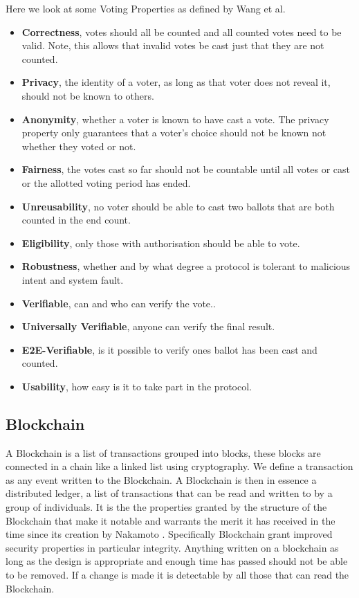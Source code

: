 \documentclass{entcs}
\begin{document}
Here we look at some Voting Properties as defined by Wang et al. \cite{RequirementOfEVoting}
\begin{itemize}
  \item {\bfseries Correctness}, votes should all be counted and all counted votes need to be valid. Note, this allows that invalid votes be cast just that they are not counted.
  \item {\bfseries Privacy}, the identity of a voter, as long as that voter does not reveal it, should not be known to others.
  \item {\bfseries Anonymity}, whether a voter is known to have cast a vote. The privacy property only guarantees that a voter's choice should not be known not whether they voted or not.
  \item {\bfseries Fairness}, the votes cast so far should not be countable until all votes or cast or the allotted voting period has ended.
  \item {\bfseries Unreusability}, no voter should be able to cast two ballots that are both counted in the end count.
  \item {\bfseries Eligibility}, only those with authorisation should be able to vote.
  \item {\bfseries Robustness}, whether and by what degree a protocol is tolerant to malicious intent and system fault.
  \item {\bfseries Verifiable}, can and who can verify the vote..
  \item {\bfseries Universally Verifiable}, anyone can verify the final result. 
  \item {\bfseries E2E-Verifiable}, is it possible to verify ones ballot has been cast and counted.
  \item {\bfseries Usability}, how easy is it to take part in the protocol.
\end{itemize}

\subsection{Blockchain}
A Blockchain is a list of transactions grouped into blocks, these blocks are connected in a chain like a linked list \cite{blockchainBeginners} using cryptography. We define a transaction as any event written to the Blockchain. A Blockchain is then in essence a distributed ledger, a list of transactions that can be read and written to by a group of individuals. It is the the properties granted by the structure of the Blockchain that make it notable and warrants the merit it has received in the time since its creation by Nakamoto \cite{BTCWhitepaper}. Specifically Blockchain grant improved security properties in particular integrity. Anything written on a blockchain as long as the design is appropriate and enough time has passed should not be able to be removed. If a change is made it is detectable by all those that can read the Blockchain.
\end{document}
